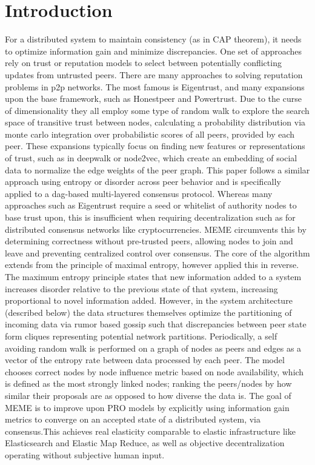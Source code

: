\documentclass{article}
\begin{document}
\section{Introduction}
For a distributed system to maintain consistency (as in CAP theorem), it needs to optimize information gain and minimize discrepancies. One set of approaches rely on trust or reputation models to select between potentially conflicting updates from untrusted peers. There are many approaches to solving reputation problems in p2p networks. The most famous is Eigentrust, and many expansions upon the base framework, such as Honestpeer and Powertrust. Due to the curse of dimensionality they all employ some type of random walk to explore the search space of transitive trust between nodes, calculating a probability distribution via monte carlo integration over probabilistic scores of all peers, provided by each peer. These expansions typically focus on finding new features or representations of trust, such as in deepwalk or node2vec, which create an embedding of social data to normalize the edge weights of the peer graph.
This paper follows a similar approach using entropy or disorder across peer behavior and is specifically applied to a dag-based multi-layered consensus protocol. Whereas many approaches such as Eigentrust require a seed or whitelist of authority nodes to base trust upon, this is insufficient when requiring decentralization such as for distributed consensus networks like cryptocurrencies. MEME circumvents this by determining correctness without pre-trusted peers, allowing nodes to join and leave and preventing centralized control over consensus.
The core of the algorithm extends from the principle of maximal entropy, however applied this in reverse. The maximum entropy principle states that new information added to a system increases disorder relative to the previous state of that system, increasing proportional to novel information added. However, in the system architecture (described below) the data structures themselves optimize the partitioning of incoming data via rumor based gossip such that discrepancies between peer state form cliques representing potential network partitions.
Periodically, a self avoiding random walk is performed on a graph of nodes as peers and edges as a vector of the entropy rate between data processed by each peer. The model chooses correct nodes by node influence metric based on node availability, which is defined as the most strongly linked nodes; ranking the peers/nodes by how similar their proposals are as opposed to how diverse the data is.
 The goal of MEME is to improve upon PRO models by explicitly using information gain metrics to converge on an accepted state of a distributed system, via consensus.This achieves real elasticity comparable to elastic infrastructure like Elasticsearch and Elastic Map Reduce, as well as objective decentralization operating without subjective human input.
\end{document}
